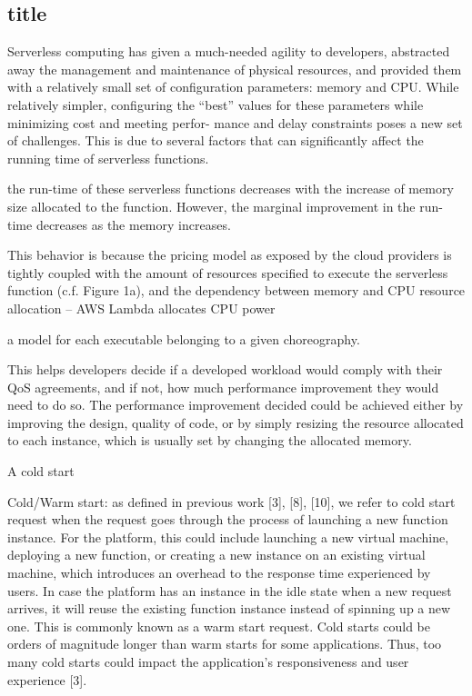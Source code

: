 \documentclass[10pt,a4paper]{report}
\theoremstyle{definition}
\begin{document}
\subsection{title}


Serverless computing has given a much-needed agility to
developers, abstracted away the management and maintenance
of physical resources, and provided them with a relatively
small set of conﬁguration parameters: memory and CPU.
While relatively simpler, conﬁguring the “best” values for
these parameters while minimizing cost and meeting perfor-
mance and delay constraints poses a new set of challenges.
This is due to several factors that can signiﬁcantly aﬀect the
running time of serverless functions.


the run-time of these serverless
functions decreases with the increase of memory size allocated
to the function. However, the marginal improvement in the
run-time decreases as the memory increases.

This behavior
is because the pricing model as exposed by the cloud providers
is tightly coupled with the amount of resources speciﬁed
to execute the serverless function (c.f. Figure 1a), and the
dependency between memory and CPU resource allocation –
AWS Lambda allocates CPU power


a model for each executable belonging to a given choreography.



This helps developers decide if a developed
workload would comply with their QoS agreements, and if
not, how much performance improvement they would need
to do so. The performance improvement decided could be
achieved either by improving the design, quality of code, or
by simply resizing the resource allocated to each instance,
which is usually set by changing the allocated memory.


A cold start 

Cold/Warm start: as deﬁned in previous work [3], [8],
[10], we refer to cold start request when the request goes
through the process of launching a new function instance.
For the platform, this could include launching a new virtual
machine, deploying a new function, or creating a new
instance on an existing virtual machine, which introduces an
overhead to the response time experienced by users. In case
the platform has an instance in the idle state when a new
request arrives, it will reuse the existing function instance
instead of spinning up a new one. This is commonly known
as a warm start request. Cold starts could be orders of
magnitude longer than warm starts for some applications.
Thus, too many cold starts could impact the application’s
responsiveness and user experience [3].
\end{document}
